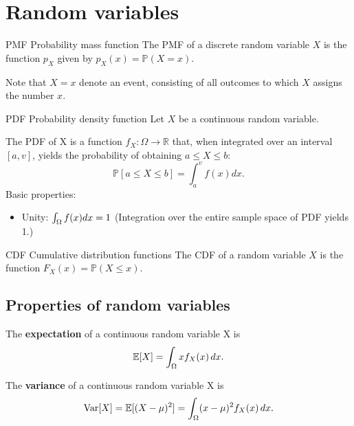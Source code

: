 \section{Random variables}

\begin{fact}{PMF \g Probability mass function}{}
    The PMF of a discrete random variable $X$ is the function $p_X$ given by $p_X(x) = \mathbb{P}(X=x)$.
    
    Note that $X=x$ denote an event, consisting of all outcomes to which $X$ assigns the number $x$.
\end{fact}


\begin{fact}{PDF \g Probability density function}{}
  Let $X$ be a continuous random variable.

  The PDF of X is a function $f_X:\Omega\rightarrow\mathbb{R}$ that, when integrated
  over an interval $[a,v]$, yields the probability of obtaining $a\le X \le b$:
  \begin{equation*}
    \mathbb{P}[a\le X \le b] = \int_{a}^{v}f(x)dx.
  \end{equation*}
  Basic properties:
  \begin{itemize}
    \item Unity: $\int_\Omega f(x)dx=1$ (Integration over the entire sample space of PDF yields 1.)
  \end{itemize}
\end{fact}

\begin{fact}{CDF \g Cumulative distribution functions}{}
    The CDF of a random variable $X$ is the function $F_X(x)=\mathbb{P}(X\le x)$.
\end{fact}

\subsection{Properties of random variables}

The \textbf{expectation} of a continuous random variable X is
\begin{equation*}
  \mathbb{E}[X] = \int_{\Omega}xf_X(x)\,dx.
\end{equation*}

The \textbf{variance} of a continuous random variable X is
\begin{equation*}
  \mathrm{Var}[X] = \mathbb{E}[(X-\mu)^2]=\int_{\Omega}(x-\mu)^2f_X(x)\,dx.
\end{equation*}

